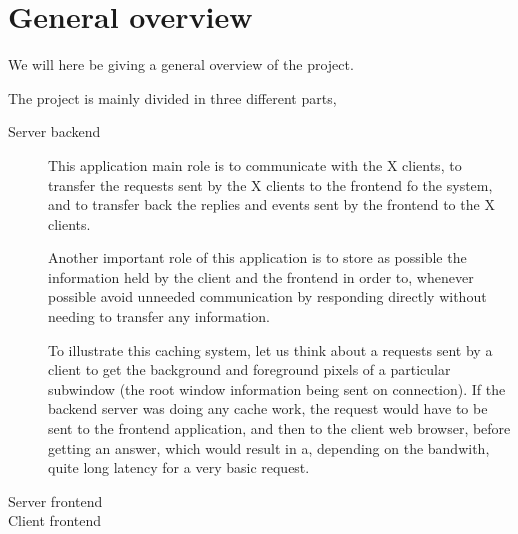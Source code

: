 \section{General overview}
We will here be giving a general overview of the project.

The project is mainly divided in three different parts, 
\begin{description}
\item[Server backend]
  This application main role is to communicate with the X clients, 
  to transfer the requests sent by the X clients to the frontend fo the system, 
  and to transfer back the replies and events sent by the frontend to the 
  X clients. 
  
  Another important role of this application is to store as possible 
  the information held by the client and the frontend in order to, whenever 
  possible avoid unneeded communication by responding directly without 
  needing to transfer any information.

  To illustrate this caching system, let us think about a requests sent by a 
  client to get the background and foreground pixels of a particular 
  subwindow (the root window information being sent on connection). If the 
  backend server was doing any cache work, the request would have to be 
  sent to the frontend application, and then to the client web browser, before 
  getting an answer, which would result in a, depending on the bandwith, 
  quite long latency for a very basic request.   
  
\item[Server frontend]
\item[Client frontend]
\end{description}



